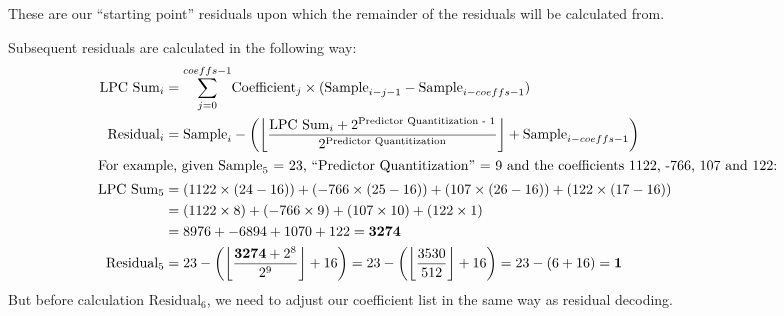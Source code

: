 These are our ``starting point'' residuals upon which the
remainder of the residuals will be calculated from.

Subsequent residuals are calculated in the following way:
\begin{align*}
\text{LPC Sum}_i &= \overset{coeffs - 1}{\underset{j = 0}{\sum}}
\text{Coefficient}_j \times (\text{Sample}_{i - j - 1} - \text{Sample}_{i - coeffs - 1}) \\
\text{Residual}_i &= \text{Sample}_i - \left( \left\lfloor \frac{\text{LPC Sum}_i + 2^{\text{Predictor Quantitization - 1}}} {2 ^ \text{Predictor Quantitization}}\right\rfloor + \text{Sample}_{i - coeffs - 1} \right) \\
\intertext{For example, given $\text{Sample}_5$ = 23,
``{Predictor Quantitization}'' = 9 and the coefficients
1122, -766, 107 and 122:}
\text{LPC Sum}_5 &=
(1122 \times (24 - 16)) + (-766 \times (25 - 16)) +
 (107 \times (26 - 16)) + (122 \times (17 - 16)) \\
&= (1122 \times 8) + (-766 \times 9) + (107 \times 10) + (122 \times 1) \\
&= 8976 + -6894 + 1070 + 122 = \textbf{3274} \\
\text{Residual}_5 &= 23 - \left( \left\lfloor \frac{\textbf{3274} + 2^8}{2 ^ 9}\right\rfloor + 16 \right) =  23 - \left( \left\lfloor \frac{3530}{512} \right\rfloor + 16 \right) = 23 - (6 + 16) = \textbf{1}
\end{align*}
But before calculation $\text{Residual}_6$, we need to adjust
our coefficient list in the same way as residual decoding.

\clearpage

